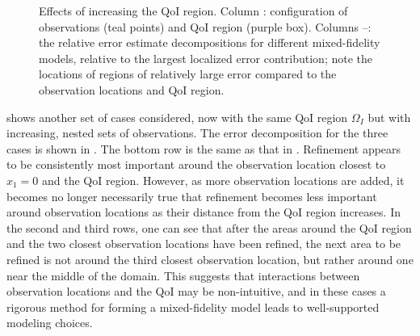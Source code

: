 \documentclass[review,sort&compress]{elsarticle}
\theoremstyle{plain} %
\theoremstyle{definition} %
\begin{document}
\begin{figure}[htbp]
{  \label{subfig:obsMFlast}
}
  \caption{Effects of increasing the QoI region. Column \protect{}: configuration of observations (teal points) and QoI region (purple box). Columns \protect{}--\protect{}: the relative error estimate decompositions for different mixed-fidelity models, relative to the largest localized error contribution; note the locations of regions of relatively large error compared to the observation locations and QoI region.}
  \label{fig:qoiStudy}
\end{figure}

 shows another set of cases considered, now with the same QoI region $\Omega_I$ but with increasing, nested sets of observations.
The error decomposition for the three cases is shown in . The bottom row is the same as that in . Refinement appears to be consistently most important around the observation location closest to $x_1=0$ and the QoI region. However, as more observation locations are added, it becomes no longer necessarily true that refinement becomes less important around observation locations as their distance from the QoI region increases. In the second and third rows, one can see that after the areas around the QoI region and the two closest observation locations have been refined, the next area to be refined is not around the third closest observation location, but rather around one near the middle of the domain. This suggests that interactions between observation locations and the QoI may be non-intuitive, and in these cases a rigorous method for forming a mixed-fidelity model leads to well-supported modeling choices.
\end{document}
